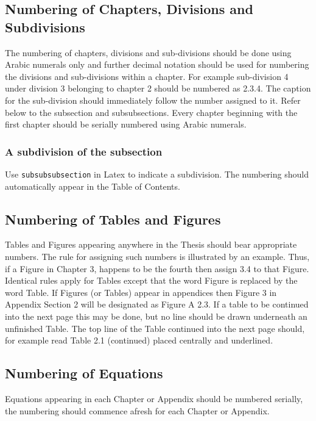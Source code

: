\subsection{Numbering of Chapters, Divisions and Subdivisions}
The numbering of chapters, divisions and sub-divisions should be done using Arabic numerals only and further decimal notation should be used for numbering the divisions and sub-divisions within a chapter. For example sub-division 4 under division 3 belonging to chapter 2 should be numbered as 2.3.4. The caption for the sub-division should immediately follow the number assigned to it. Refer below to the subsection and subsubsections. Every chapter beginning with the first chapter should be serially numbered using Arabic numerals. 
\subsubsection{A subdivision of the subsection}
Use \texttt{subsubsubsection} in Latex to indicate a subdivision. The numbering should automatically appear in the Table of Contents. 
\subsection{Numbering of Tables and Figures}
Tables and Figures appearing anywhere in the Thesis should bear appropriate numbers. The rule for assigning such numbers is illustrated by an example. Thus, if a Figure in Chapter 3, happens to be the fourth then assign 3.4 to that Figure. Identical rules apply for Tables except that the word Figure is replaced by the word Table. If Figures (or Tables) appear in appendices then Figure 3 in Appendix Section 2 will be designated as Figure A 2.3. If a table to be continued into the next page this may be done, but no line should be drawn underneath an unfinished Table. The top line of the Table continued into the next page should, for example read Table 2.1
(continued) placed centrally and underlined.

\subsection{Numbering of Equations}
Equations appearing in each Chapter or Appendix should be numbered serially, the numbering should commence afresh for each Chapter or Appendix.



